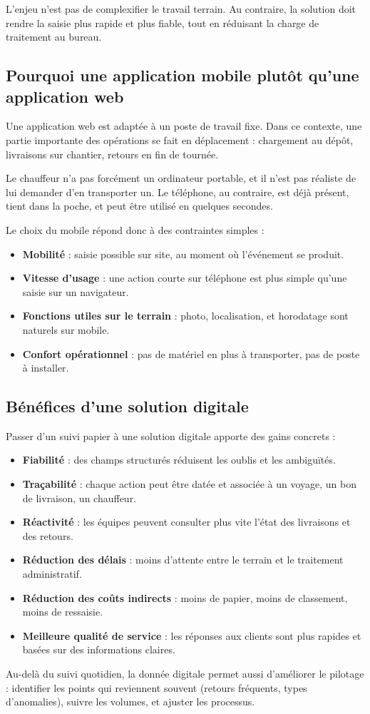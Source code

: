 \documentclass[12pt,a4paper]{article}
\begin{document}
    L'enjeu n'est pas de complexifier le travail terrain. Au contraire, la solution doit rendre la saisie plus rapide et plus fiable, tout en réduisant la charge de traitement au bureau.

    \subsection*{Pourquoi une application mobile plutôt qu'une application web}
    Une application web est adaptée à un poste de travail fixe. Dans ce contexte, une partie importante des opérations se fait en déplacement : chargement au dépôt, livraisons sur chantier, retours en fin de tournée.

    Le chauffeur n'a pas forcément un ordinateur portable, et il n'est pas réaliste de lui demander d'en transporter un. Le téléphone, au contraire, est déjà présent, tient dans la poche, et peut être utilisé en quelques secondes.

    Le choix du mobile répond donc à des contraintes simples :
    \begin{itemize}[leftmargin=1.2em]
    \item \textbf{Mobilité} : saisie possible sur site, au moment où l'événement se produit.
    \item \textbf{Vitesse d'usage} : une action courte sur téléphone est plus simple qu'une saisie sur un navigateur.
    \item \textbf{Fonctions utiles sur le terrain} : photo, localisation, et horodatage sont naturels sur mobile.
    \item \textbf{Confort opérationnel} : pas de matériel en plus à transporter, pas de poste à installer.
    \end{itemize}

    \subsection*{Bénéfices d'une solution digitale}
    Passer d'un suivi papier à une solution digitale apporte des gains concrets :
    \begin{itemize}[leftmargin=1.2em]
    \item \textbf{Fiabilité} : des champs structurés réduisent les oublis et les ambiguïtés.
    \item \textbf{Traçabilité} : chaque action peut être datée et associée à un voyage, un bon de livraison, un chauffeur.
    \item \textbf{Réactivité} : les équipes peuvent consulter plus vite l'état des livraisons et des retours.
    \item \textbf{Réduction des délais} : moins d'attente entre le terrain et le traitement administratif.
    \item \textbf{Réduction des coûts indirects} : moins de papier, moins de classement, moins de ressaisie.
    \item \textbf{Meilleure qualité de service} : les réponses aux clients sont plus rapides et basées sur des informations claires.
    \end{itemize}

    Au-delà du suivi quotidien, la donnée digitale permet aussi d'améliorer le pilotage : identifier les points qui reviennent souvent (retours fréquents, types d'anomalies), suivre les volumes, et ajuster les processus.

    
\end{document}
